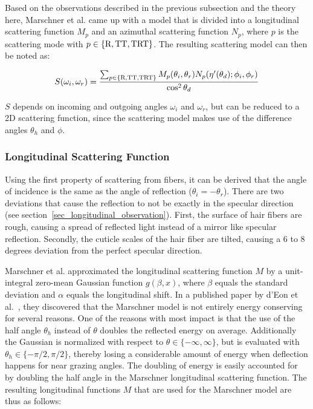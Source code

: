 \documentclass[11pt,a4paper]{report}
\begin{document}
Based on the observations described in the previous subsection and the theory here, Marschner et al. came up with a model that is divided into a longitudinal scattering function $M_p$ and an azimuthal scattering function $N_p$, where $p$ is the scattering mode with $p \in \{\textnormal{R}, \textnormal{TT}, \textnormal{TRT}\}$. The resulting scattering model can then be noted as:

\begin{equation}
\label{marschner_model_scatterfunction}
S(\omega_i, \omega_r) = \frac{\sum_{p \in \{\textnormal{R}, \textnormal{TT}, \textnormal{TRT}\}} M_p(\theta_i, \theta_r) N_p(\eta'(\theta_d); \phi_i, \phi_r)}{\cos^2 \theta_d}
\end{equation}

$S$ depends on incoming and outgoing angles $\omega_i$ and $\omega_r$, but can be reduced to a 2D scattering function, since the scattering model makes use of the difference angles $\theta_h$ and $\phi$.

\subsubsection{Longitudinal Scattering Function}
\label{marschner_longitudinal_scattering_function}

Using the first property of scattering from fibers, it can be derived that the angle of incidence is the same as the angle of reflection ($\theta_i = -\theta_r$). There are two deviations that cause the reflection to not be exactly in the specular direction (see section~\ref{sec_longitudinal_observation}). First, the surface of hair fibers are rough, causing a spread of reflected light instead of a mirror like specular reflection. Secondly, the cuticle scales of the hair fiber are tilted, causing a 6 to 8 degrees deviation from the perfect specular direction.

Marschner et al. approximated the longitudinal scattering function $M$ by a unit-integral zero-mean Gaussian function $g(\beta, x)$, where $\beta$ equals the standard deviation and $\alpha$ equals the longitudinal shift. In a published paper by d'Eon et al.~\cite{eon2011}, they discovered that the Marschner model is not entirely energy conserving for several reasons. One of the reasons with most impact is that the use of the half angle $\theta_h$ instead of $\theta$ doubles the reflected energy on average. Additionally the Gaussian is normalized with respect to $\theta \in \{-\infty, \infty \}$, but is evaluated with $\theta_h \in \{ -\pi/2, \pi/2 \}$, thereby losing a considerable amount of energy when deflection happens for near grazing angles. The doubling of energy is easily accounted for by doubling the half angle in the Marschner longitudinal scattering function. The resulting longitudinal functions $M$ that are used for the Marschner model are thus as follows:
\end{document}
